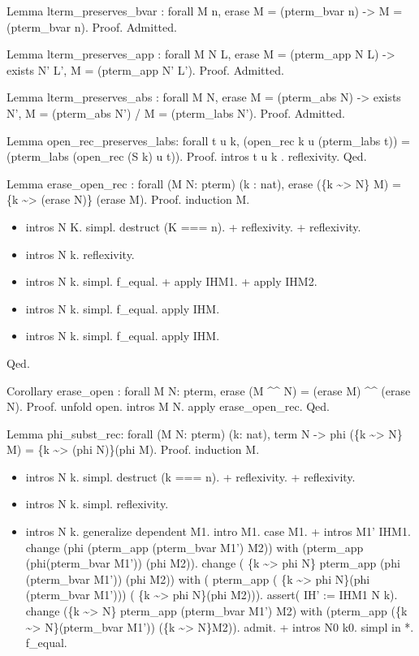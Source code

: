 Lemma lterm\_preserves\_bvar : forall M n, erase M = (pterm\_bvar n) -> M = (pterm\_bvar n).
Proof.
  Admitted.


Lemma lterm\_preserves\_app : forall M N L, erase M = (pterm\_app N L) -> exists N' L', M = (pterm\_app N' L').
Proof.
  Admitted.


Lemma lterm\_preserves\_abs : forall M N, erase M = (pterm\_abs N) -> exists N', M = (pterm\_abs N') / M = (pterm\_labs N').
Proof.
Admitted.


Lemma open\_rec\_preserves\_labs: forall t u k, (open\_rec k u (pterm\_labs t)) = (pterm\_labs (open\_rec (S k) u t)).
Proof.
  intros t u k .
  reflexivity.
Qed.


Lemma erase\_open\_rec : forall (M N: pterm) (k : nat), erase (\{k \~{}> N\} M) = \{k \~{}> (erase N)\} (erase M).
Proof.
  induction M.

\begin{itemize}
\item  intros N K.
    simpl.
    destruct (K === n).
    + reflexivity.
    + reflexivity.

\item  intros N k. 
    reflexivity.

\item  intros N k.
    simpl.
    f\_equal.
    + apply IHM1.
    + apply IHM2.

\item  intros N k.
    simpl.
    f\_equal.
    apply IHM.

\item  intros N k.
    simpl.
    f\_equal.
    apply IHM.

\end{itemize}
Qed.


Corollary erase\_open : forall M N: pterm, erase (M \^{}\^{} N) = (erase M) \^{}\^{} (erase N).
Proof.
  unfold open.
  intros M N.
  apply  erase\_open\_rec.
Qed.


Lemma phi\_subst\_rec: forall (M N: pterm) (k: nat), term N -> phi (\{k \~{}> N\} M) = \{k \~{}> (phi N)\}(phi M).
Proof.
  induction M.

\begin{itemize}
\item  intros N k.
    simpl.
    destruct (k === n).
    + reflexivity.
    + reflexivity.

\item  intros N k.
    simpl.
    reflexivity.

\item  intros N k.
    generalize dependent M1. 
    intro M1.
    case M1.
    + intros M1' IHM1.
      change (phi (pterm\_app (pterm\_bvar M1') M2)) with  (pterm\_app (phi(pterm\_bvar M1')) (phi M2)).
      change ( \{k \~{}> phi N\} pterm\_app (phi (pterm\_bvar M1')) (phi M2)) with
          ( pterm\_app ( \{k \~{}> phi N\}(phi (pterm\_bvar M1'))) ( \{k \~{}> phi N\}(phi M2))).
      assert( IH' := IHM1 N k).
      change (\{k \~{}> N\} pterm\_app (pterm\_bvar M1') M2) with (pterm\_app (\{k \~{}> N\}(pterm\_bvar M1')) (\{k \~{}> N\}M2)).
      admit.     + intros N0 k0.
      simpl in *.
      f\_equal.

\end{itemize}
                                              

